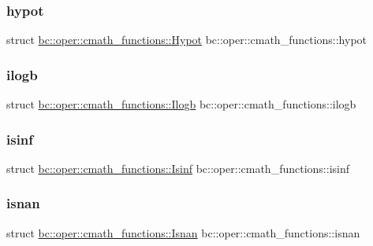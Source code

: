 \subsubsection{\texorpdfstring{hypot}{hypot}}
{\footnotesize\ttfamily struct \hyperlink{structbc_1_1oper_1_1cmath__functions_1_1Hypot}{bc\+::oper\+::cmath\+\_\+functions\+::\+Hypot}   bc\+::oper\+::cmath\+\_\+functions\+::hypot}

\mbox{\label{namespacebc_1_1oper_1_1cmath__functions_aa14e82c79683fdc614fc3ded09696935}} 
\subsubsection{\texorpdfstring{ilogb}{ilogb}}
{\footnotesize\ttfamily struct \hyperlink{structbc_1_1oper_1_1cmath__functions_1_1Ilogb}{bc\+::oper\+::cmath\+\_\+functions\+::\+Ilogb}   bc\+::oper\+::cmath\+\_\+functions\+::ilogb}

\mbox{\label{namespacebc_1_1oper_1_1cmath__functions_aeda712b826512845a8273fe5ede96c9f}} 
\subsubsection{\texorpdfstring{isinf}{isinf}}
{\footnotesize\ttfamily struct \hyperlink{structbc_1_1oper_1_1cmath__functions_1_1Isinf}{bc\+::oper\+::cmath\+\_\+functions\+::\+Isinf}   bc\+::oper\+::cmath\+\_\+functions\+::isinf}

\mbox{\label{namespacebc_1_1oper_1_1cmath__functions_ab6e9b2070f6a77dff6a465ece81aa56c}} 
\subsubsection{\texorpdfstring{isnan}{isnan}}
{\footnotesize\ttfamily struct \hyperlink{structbc_1_1oper_1_1cmath__functions_1_1Isnan}{bc\+::oper\+::cmath\+\_\+functions\+::\+Isnan}   bc\+::oper\+::cmath\+\_\+functions\+::isnan}

